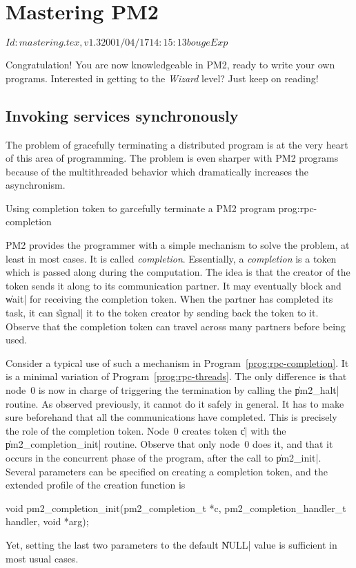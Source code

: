 \chapter{Mastering PM2}

\stamp $Id: mastering.tex,v 1.3 2001/04/17 14:15:13 bouge Exp $

Congratulation! You are now knowledgeable in PM2, ready to write your
own programs.  Interested in getting to the \emph{Wizard} level? Just
keep on reading!

\section{Invoking services synchronously}

The problem of gracefully terminating a distributed program is at the
very heart of this area of programming. The problem is even sharper
with PM2 programs because of the multithreaded behavior which
dramatically increases the asynchronism.

 {Using completion token to
  garcefully terminate a PM2 program} {prog:rpc-completion}

PM2 provides the programmer with a simple mechanism to solve the
problem, at least in most cases. It is called \emph{completion}.
Essentially, a \emph{completion} is a token which is passed along
during the computation. The idea is that the creator of the token
sends it along to its communication partner. It may eventually block and
\|wait| for receiving the completion token. When the partner has
completed its task, it can \|signal| it to the token creator by
sending back the token to it. Observe that the completion token can
travel across many partners before being used. 

Consider a typical use of such a mechanism in
Program~\ref{prog:rpc-completion}. It is a minimal variation of
Program~\ref{prog:rpc-threads}. The only difference is that node~0 is now
in charge of triggering the termination by calling the \|pm2_halt|
routine. As observed previously, it cannot do it safely in general.
It has to make sure beforehand that all the communications have
completed. This is precisely the role of the completion token. Node~0
creates token \|c| with the \|pm2_completion_init| routine. Observe
that only node~0 does it, and that it occurs in the concurrent phase
of the program, after the call to \|pm2_init|. Several parameters can
be specified on creating a completion token, and the extended profile of
the creation function is
\begin{program}
void pm2_completion_init(pm2_completion_t *c,
                         pm2_completion_handler_t handler,
                         void *arg);
\end{program}
Yet, setting the last two parameters to the default \|NULL| value is
sufficient in most usual cases. 

